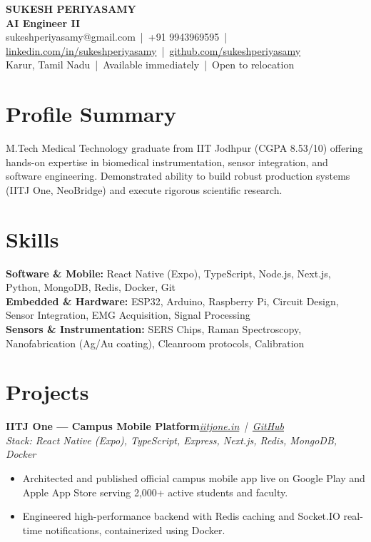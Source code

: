 \documentclass[9.2pt,a4paper]{article}
\newcommand{\role}[3]{\textbf{#1}\hfill\textit{#2}\\[-2pt]\textit{\small #3}\par}
\begin{document}
\begin{center}
{\huge\bfseries SUKESH PERIYASAMY}\\[1.5pt]
{\large\bfseries\color{accent} AI Engineer II}\\[1.5pt]
\small sukeshperiyasamy@gmail.com \,|\, +91 9943969595 \,|\, \href{https://linkedin.com/in/sukeshperiyasamy}{linkedin.com/in/sukeshperiyasamy} \,|\, \href{https://github.com/sukeshperiyasamy}{github.com/sukeshperiyasamy}\\
Karur, Tamil Nadu \,|\, Available immediately \,|\, Open to relocation
\end{center}

\section{Profile Summary}
M.Tech Medical Technology graduate from IIT Jodhpur (CGPA 8.53/10) offering hands-on expertise in biomedical instrumentation, sensor integration, and software engineering. Demonstrated ability to build robust production systems (IITJ One, NeoBridge) and execute rigorous scientific research.

\section{Skills}
\textbf{Software \& Mobile:} React Native (Expo), TypeScript, Node.js, Next.js, Python, MongoDB, Redis, Docker, Git\\
\textbf{Embedded \& Hardware:} ESP32, Arduino, Raspberry Pi, Circuit Design, Sensor Integration, EMG Acquisition, Signal Processing\\
\textbf{Sensors \& Instrumentation:} SERS Chips, Raman Spectroscopy, Nanofabrication (Ag/Au coating), Cleanroom protocols, Calibration

\section{Projects}
\role{IITJ One --- Campus Mobile Platform}{\href{https://iitjone.in}{iitjone.in} \,|\, \href{https://github.com/Godevs04/IITJ_One}{GitHub}}{Stack: React Native (Expo), TypeScript, Express, Next.js, Redis, MongoDB, Docker}
\begin{itemize}
  \item Architected and published official campus mobile app live on Google Play and Apple App Store serving 2,000+ active students and faculty.
  \item Engineered high-performance backend with Redis caching and Socket.IO real-time notifications, containerized using Docker.
\end{itemize}
\end{document}
